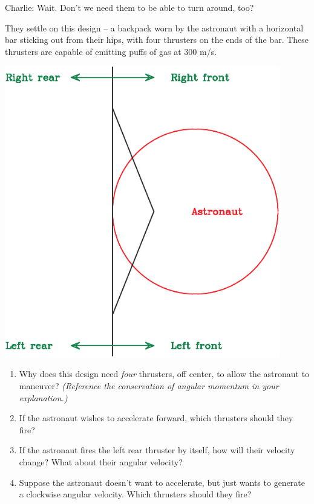 \documentclass[12pt]{article}
\begin{document}
\begin{enumerate}
\begin{minipage}{0.6\textwidth}
		Charlie: Wait. Don't we need them to be able to turn around, too?

		They settle on this design -- a backpack worn by the astronaut with a horizontal bar sticking out from their hips, with four thrusters on the ends of the bar. These thrusters are capable of emitting puffs
		of gas at 300 m/s.
		\end{minipage}
		\begin{minipage}{0.3\textwidth}
			\includegraphics[width=0.9\textwidth]{jetpack-crop.pdf}
		\end{minipage}
		\begin{enumerate}
			\item Why does this design need {\it four} thrusters, off center, to allow the astronaut to maneuver? {\it (Reference the conservation of angular momentum in your explanation.)}
			\item If the astronaut wishes to accelerate forward, which thrusters should they fire?
			\item If the astronaut fires the left rear thruster by itself, how will their velocity change? What about their angular velocity?
			\item Suppose the astronaut doesn't want to accelerate, but just wants to generate a clockwise angular velocity. Which thrusters should they fire?
		\end{enumerate}
		

\end{enumerate}
\end{document}
